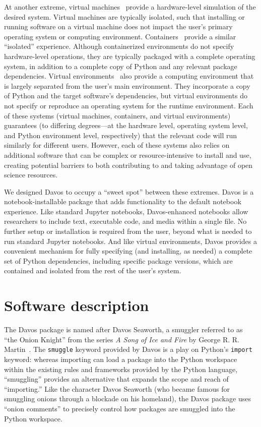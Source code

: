 \documentclass[preprint,12pt,a4paper]{elsarticle}
\begin{document}
At another extreme, virtual machines~\cite{Gold74, AltiEtal05, Rose99}
provide a hardware-level simulation of the desired system.  Virtual
machines are typically isolated, such that installing or running
software on a virtual machine does not impact the user's primary
operating system or computing environment.
Containers~\cite[e.g.,][]{Merk14, KurtEtal17} provide a similar
``isolated'' experience. Although containerized environments do not
specify hardware-level operations, they are typically packaged with a
complete operating system, in addition to a complete copy of Python
and any relevant package dependencies. Virtual
environments~\cite[e.g.,][]{Anac12, Eust19} also provide a computing
environment that is largely separated from the user's main
environment. They incorporate a copy of Python and the target
software's dependencies, but virtual environments do not specify or
reproduce an operating system for the runtime environment. Each of
these systems (virtual machines, containers, and virtual environments)
guarantees (to differing degrees---at the hardware level, operating
system level, and Python environment level, respectively) that the
relevant code will run similarly for different users. However, each of
these systems also relies on additional software that can be complex
or resource-intensive to install and use, creating potential barriers
to both contributing to and taking advantage of open science
resources.

We designed Davos to occupy a ``sweet spot'' between these extremes.
Davos is a notebook-installable package that adds functionality to the
default notebook experience. Like standard Jupyter notebooks,
Davos-enhanced notebooks allow researchers to include text, executable
code, and media within a single file. No further setup or installation is
required from the user, beyond what is needed to run standard Jupyter
notebooks. And like virtual environments, Davos provides a convenient
mechanism for fully specifying (and installing, as needed) a complete set of
Python dependencies, including specific package versions, which are contained
and isolated from the rest of the user's system.


\section{Software description}

The Davos package is named after Davos Seaworth, a smuggler referred
to as ``the Onion Knight'' from the series \textit{A Song of Ice and Fire} by
George R. R. Martin~\cite{Mart98}. The \texttt{smuggle} keyword provided by
Davos is a play on Python's \texttt{import} keyword: whereas importing
can load a package into the Python workspace within the existing rules and
frameworks provided by the Python language, ``smuggling'' provides an
alternative that expands the scope and reach of ``importing.'' Like the
character Davos Seaworth (who became famous for smuggling onions through a
blockade on his homeland), the Davos package uses ``onion comments'' to precisely control how
packages are smuggled into the Python workspace.
\end{document}
